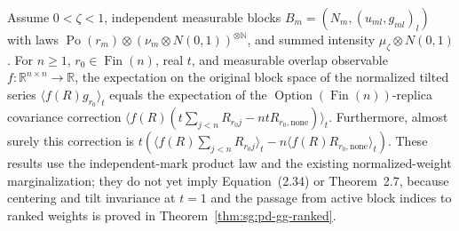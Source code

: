 \begin{lemma}\label{lem:sg:pd-ibp-blocks}
  \leanok
  Assume $0<\zeta<1$, independent measurable blocks
  $B_m=(N_m,(u_{ml},g_{ml})_l)$ with laws
  $\operatorname{Po}(r_m)\otimes(\nu_m\otimes N(0,1))^{\otimes\mathbb N}$,
  and summed intensity $\mu_\zeta\otimes N(0,1)$. For $n\ge1$,
  $r_0\in\operatorname{Fin}(n)$, real $t$, and measurable overlap observable
  $f:\mathbb R^{n\times n}\to\mathbb R$, the expectation on the original
  block space of the normalized tilted series
  $\langle f(R)g_{r_0}\rangle_t$ equals the expectation of the
  $\operatorname{Option}(\operatorname{Fin}(n))$-replica covariance correction
  $\langle f(R)(t\sum_{j<n}R_{r_0j}-ntR_{r_0,\mathrm{none}})\rangle_t$.
  Furthermore, almost surely this correction is
  $t(\langle f(R)\sum_{j<n}R_{r_0j}\rangle_t
     -n\langle f(R)R_{r_0,\mathrm{none}}\rangle_t)$.
  These results use the independent-mark product law and the existing
  normalized-weight marginalization; they do not yet imply Equation~(2.34)
  or Theorem~2.7, because centering and tilt invariance at $t=1$ and the
  passage from active block indices to ranked weights is proved in Theorem~\ref{thm:sg:pd-gg-ranked}.
\end{lemma}

